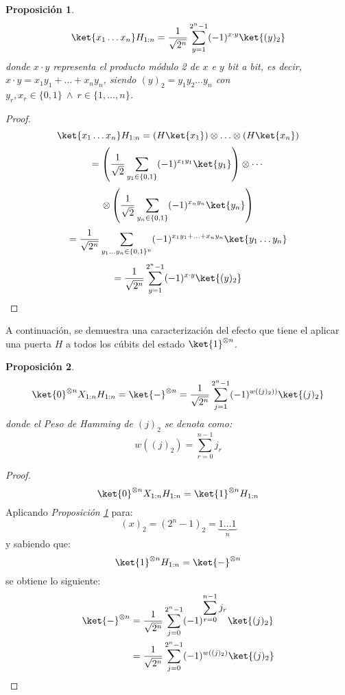 \documentclass[10pt,conference,a4paper]{IEEEtran}
\newtheorem{prop}{Proposición}[section]
\begin{document}
\vspace{1.5mm}
\begin{prop}
    \begin{equation}
        \ket{x_{1}\ldots x_{n}} H_{1:n} = \dfrac{1}{\sqrt{2^n}}\displaystyle\sum_{y=1}^{2^n-1}(-1)^{x\cdot y}\ket{(y)_2}
\end{equation}
\label{prop:1}
donde $x\cdot y$ representa el producto módulo 2 de $x$ e $y$ bit a bit, es decir, $x\cdot y = x_{1}y_{1}+\ldots + x_n y_n$, siendo $(y)_2=y_{1}y_2\ldots y_n$ con $y_r,x_r\in\{0,1\}\ \land \ r\in\{1,\ldots,n\}$.
\end{prop}
\begin{proof}
    $$\ket{x_{1}\ldots x_n}H_{1:n} = (H\ket{x_{1}})\otimes\ldots\otimes ( H\ket{x_n})$$
$$=\left(\dfrac{1}{\sqrt{2}}\displaystyle\sum_{y_{1}\in\{0,1\}}(-1)^{x_{1}y_{1}}\ket{y_{1}}\right )\otimes\cdots$$
$$\otimes \left(\dfrac{1}{\sqrt{2}}\displaystyle\sum_{y_{n}\in\{0,1\}}(-1)^{x_{n}y_{n}}\ket{y_{n}}\right )$$
$$=\dfrac{1}{\sqrt{2^n}}\displaystyle\sum_{y_{1}\ldots y_n\in\{0,1\}^n}(-1)^{x_{1}y_{1}+\ldots + x_n y_n}\ket{y_{1}\ldots y_n}$$
$$=\dfrac{1}{\sqrt{2^n}}\displaystyle\sum_{y=1}^{2^n-1}(-1)^{x\cdot y}\ket{(y)_2}$$
\end{proof}
\vspace{1.5mm}
 A continuación, se demuestra una caracterización del efecto que tiene el aplicar una puerta $H$ a todos los cúbits del estado 
 $\ket{1}^{\otimes n}$.
\vspace{1.5mm}
\begin{prop}
    \begin{equation}
        \ket{0}^{\otimes n}X_{1:n}H_{1:n} = \ket{-}^{\otimes n}= \displaystyle \dfrac{1}{\sqrt{2^n}}\sum_{j=1}^{2^n-1}(-1)^{w((j)_2))}\ket{(j)_2}
\end{equation}
\label{prop:2}
donde el Peso de Hamming de $(j)_2$ se denota como: 
$$w((j)_2)=\displaystyle\sum_{r=0}^{n-1}j_r$$
\end{prop}
\begin{proof}
     $$\ket{0}^{\otimes n}X_{1:n}H_{1:n} =\ket{1}^{\otimes n} H_{1:n}$$
     Aplicando \textit{Proposición \ref{prop:1}} para:\\ 
     $$(x)_2=(2^n-1)_2=\underbrace{1\ldots 1}_n$$ y sabiendo que:\\
     $$\ket{1}^{\otimes n} H_{1:n}=\ket{-}^{\otimes n}$$
     se obtiene lo siguiente:
     \begin{align*}
         \ket{-}^{\otimes n} &= \dfrac{1}{\sqrt{2^n}}\displaystyle\sum_{j=0}^{2^n-1}(-1)^{\displaystyle\sum_{r=0}^{n-1}j_r}\ket{(j)_2}\\
         &=\dfrac{1}{\sqrt{2^n}}\displaystyle\sum_{j=0}^{2^n-1}(-1)^{w((j)_2)}\ket{(j)_2}
     \end{align*}
\end{proof}
\end{document}

